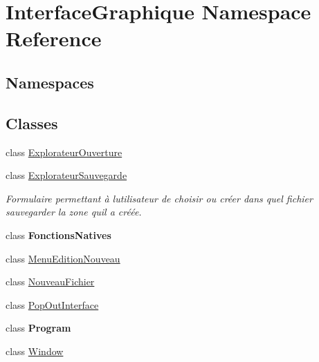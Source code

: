 \hypertarget{namespace_interface_graphique}{}\section{Interface\+Graphique Namespace Reference}
\label{namespace_interface_graphique}
\subsection*{Namespaces}
\begin{DoxyCompactItemize}
\end{DoxyCompactItemize}
\subsection*{Classes}
\begin{DoxyCompactItemize}
\item 
class \hyperlink{class_interface_graphique_1_1_explorateur_ouverture}{Explorateur\+Ouverture}
\item 
class \hyperlink{class_interface_graphique_1_1_explorateur_sauvegarde}{Explorateur\+Sauvegarde}
\begin{DoxyCompactList}\small\item\em Formulaire permettant à l\textquotesingle{}utilisateur de choisir ou créer dans quel fichier sauvegarder la zone qu\textquotesingle{}il a créée. \end{DoxyCompactList}\item 
class {\bfseries Fonctions\+Natives}
\item 
class \hyperlink{class_interface_graphique_1_1_menu_edition_nouveau}{Menu\+Edition\+Nouveau}
\item 
class \hyperlink{class_interface_graphique_1_1_nouveau_fichier}{Nouveau\+Fichier}
\item 
class \hyperlink{class_interface_graphique_1_1_pop_out_interface}{Pop\+Out\+Interface}
\item 
class {\bfseries Program}
\item 
class \hyperlink{class_interface_graphique_1_1_window}{Window}
\end{DoxyCompactItemize}
